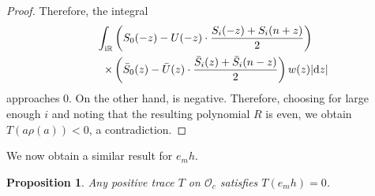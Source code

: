 \documentclass[pdftex]{sigma}
\newcommand\RR{\mathbb{R}}
\newcommand\cO{\mathcal{O}}
\renewcommand\d{\mathrm{d}}
\renewcommand\S{\bar{S}}
\numberwithin{equation}{section}
\newtheorem{Proposition}[Theorem]{Proposition}
\theoremstyle{definition}
\begin{document}
\begin{proof}
 Therefore, the integral
 \begin{gather*}
 \int_{{\rm i}\RR} \left( S_0 (-z)
 - U(-z) \cdot \frac{S_i (-z) + S_i (n + z)}{2} \right)\\
 \qquad\times
 \left( \S_0 (z)
 - \bar{U}(z) \cdot \frac{\S_i (z) + \S_i (n - z)}{2}
 \right)
 w(z) |\d z|
 \end{gather*}
 approaches $0$.
 On the other hand,
 is negative.
 Therefore, choosing
 for large enough $i$
 and noting that the resulting polynomial $R$ is even,
 we obtain $T(a \rho(a)) < 0$,
 a contradiction.
\end{proof}

We now obtain a similar result for $e_m h$.

\begin{Proposition}
 \label{prop:pos_e_m}
 Any positive trace $T$ on $\cO_c$ satisfies $T(e_m h) = 0$.
\end{Proposition}
\end{document}
